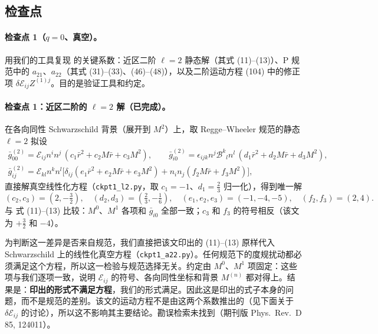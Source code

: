 \documentclass[11pt,a4paper]{ctexart}
\numberwithin{equation}{section}
\begin{document}
\subsection{检查点}

\paragraph{检查点 1（$q=0$、真空）。}用我们的工具复现 \citet{Gralla2012} 的关键系数：近区二阶 $\ell=2$ 静态解（其式 (11)--(13)）、P 规范中的 $a_{21}$、$a_{22}$（其式 (31)--(33)、(46)--(48)），以及二阶运动方程 (104) 中的修正项 $\delta\mathcal E_{ij}Z^{(1)j}$。目的是验证工具和约定。

\paragraph{检查点 1：近区二阶的 $\ell=2$ 解（已完成）。}在各向同性 Schwarzschild 背景（展开到 $M^2$）上，取 Regge--Wheeler 规范的静态 $\ell=2$ 拟设
\begin{gather*}
\bar g^{(2)}_{00}=\mathcal E_{ij}n^in^j\,(c_1\bar r^2+c_2M\bar r+c_3M^2),\qquad
\bar g^{(2)}_{i0}=\epsilon_{ijk}n^j\mathcal B^k{}_ln^l\,(d_1\bar r^2+d_2M\bar r+d_3M^2),\\
\bar g^{(2)}_{ij}=\mathcal E_{kl}n^kn^l\big[\delta_{ij}(e_1\bar r^2+e_2M\bar r+e_3M^2)+n_in_j(f_2M\bar r+f_3M^2)\big],
\end{gather*}
直接解真空线性化方程（\texttt{ckpt1\_l2.py}，取 $c_1=-1$、$d_1=\tfrac23$ 归一化），得到唯一解
\begin{equation*}
(c_2,c_3)=(2,-\tfrac32),\quad(d_2,d_3)=(\tfrac23,-\tfrac16),\quad(e_1,e_2,e_3)=(-1,-4,-5),\quad(f_2,f_3)=(2,4).
\end{equation*}
与 \citet{Gralla2012} 式 (11)--(13) 比较：$M^0$、$M^1$ 各项和 $\bar g_{i0}$ 全部一致；$c_3$ 和 $f_3$ 的符号相反（该文为 $+\tfrac32$ 和 $-4$）。

为判断这一差异是否来自规范，我们直接把该文印出的 (11)--(13) 原样代入 Schwarzschild 上的线性化真空方程（\texttt{ckpt1\_a22.py}）。任何规范下的度规扰动都必须满足这个方程，所以这一检验与规范选择无关。约定由 $M^0$、$M^1$ 项固定：这些项与我们逐项一致，说明 $\mathcal E_{ij}$ 的符号、各向同性坐标和背景 $M^{(n)}$ 都对得上。结果是：\textbf{印出的形式不满足方程}，我们的形式满足。因此这是印出的式子本身的问题，而不是规范的差别。该文的运动方程不是由这两个系数推出的（见下面关于 $\delta\mathcal E_{ij}$ 的讨论），所以这不影响其主要结论。勘误检索未找到（期刊版 Phys.\ Rev.\ D 85, 124011）。
\end{document}
